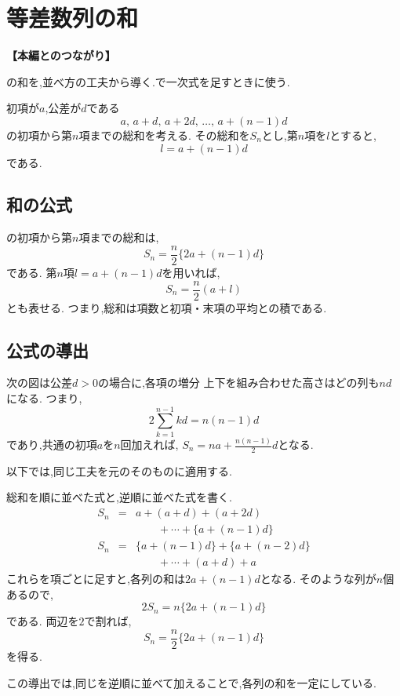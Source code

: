 
\section{等差数列の和}\label{節：等差数列とその総和の導出}
  \noindent\textbf{【本編とのつながり】}\par
  の和を,並べ方の工夫から導く.で一次式を足すときに使う.

  初項が$a$,公差が$d$である
  \[
    a,\,a+d,\,a+2d,\,\ldots,\,a+(n-1)d
  \]
  の初項から第$n$項までの総和を考える.
  その総和を$S_n$とし,第$n$項を$l$とすると,
  \[
    l=a+(n-1)d
  \]
  である.

  \subsection{和の公式}\label{節：等差数列とその総和の導出：総和の公式}
    の初項から第$n$項までの総和は,
    \[
      S_n
      =
      \frac{n}{2}\{2a+(n-1)d\}
    \]
    である.
    第$n$項$l=a+(n-1)d$を用いれば,
    \[
      S_n=\frac{n}{2}(a+l)
    \]
    とも表せる.
    つまり,総和は項数と初項・末項の平均との積である.

  \subsection{公式の導出}\label{節：等差数列とその総和の導出：公式の導出}

    次の図は公差$d>0$の場合に,各項の増分
    上下を組み合わせた高さはどの列も$nd$になる.
    つまり,
    \[
      2\sum_{k=1}^{n-1}kd=n(n-1)d
    \]
    であり,共通の初項$a$を$n$回加えれば,
    $S_n=na+\displaystyle\frac{n(n-1)}{2}d$となる.
  \BookFigArithmeticSum

    以下では,同じ工夫を元のそのものに適用する.

    総和を順に並べた式と,逆順に並べた式を書く.
    \[
      \begin{array}{rcl}
        S_n
          &=&
          a+(a+d)+(a+2d)\\
          &&\qquad +\cdots+\{a+(n-1)d\}\\
        S_n
          &=&
          \{a+(n-1)d\}+\{a+(n-2)d\}\\
          &&\qquad +\cdots+(a+d)+a
      \end{array}
    \]
    これらを項ごとに足すと,各列の和は$2a+(n-1)d$となる.
    そのような列が$n$個あるので,
    \[
      2S_n=n\{2a+(n-1)d\}
    \]
    である.
    両辺を$2$で割れば,
    \[
      S_n=\frac{n}{2}\{2a+(n-1)d\}
    \]
    を得る.

    この導出では,同じを逆順に並べて加えることで,各列の和を一定にしている.
